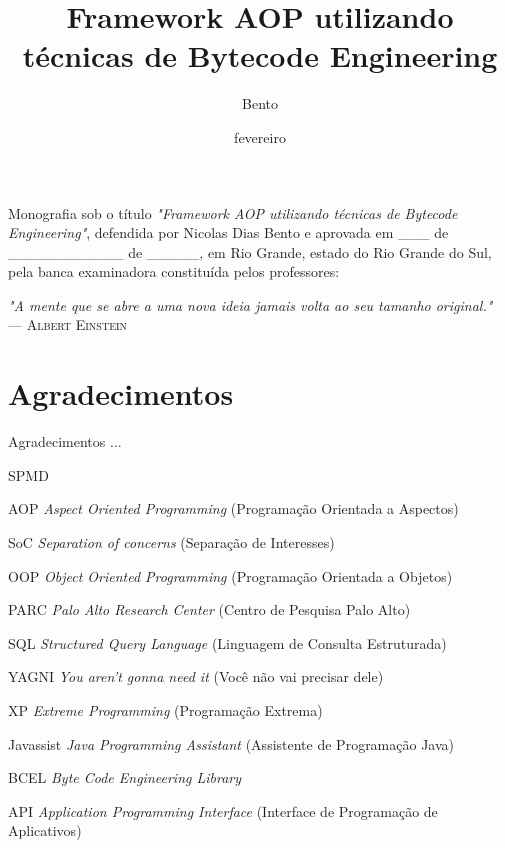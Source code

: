\documentclass[tc,oneside]{iiufrgs}
\title{Framework AOP utilizando técnicas de Bytecode Engineering}
\author{Bento}{Nicolas Dias}
\date{fevereiro}{2014}
\begin{document}
\maketitle

\begin{folhadeaprovacao}
Monografia sob o título \textit{"Framework AOP utilizando técnicas de Bytecode Engineering"}, defendida por Nicolas Dias Bento e aprovada em \_\_\_ de \_\_\_\_\_\_\_\_\_\_\_ de \_\_\_\_\_, em Rio Grande, estado do Rio Grande do Sul, pela banca examinadora constituída pelos professores:
\end{folhadeaprovacao}

\clearpage

\begin{flushright}
\mbox{}\vfill
{\sffamily\itshape
"A mente que se abre a uma nova ideia jamais volta ao seu tamanho original."\\}
--- \textsc{Albert Einstein}
\end{flushright}

\chapter*{Agradecimentos}

Agradecimentos ...

\tableofcontents

\begin{listofabbrv}{SPMD}
	\item[AOP] \textit{Aspect Oriented Programming} (Programação Orientada a Aspectos)
	\item[SoC] \textit{Separation of concerns} (Separação de Interesses)
	\item[OOP] \textit{Object Oriented Programming} (Programação Orientada a Objetos)
	\item[PARC] \textit{Palo Alto Research Center} (Centro de Pesquisa Palo Alto) 
	\item[SQL] \textit{Structured Query Language} (Linguagem de Consulta Estruturada)
	\item[YAGNI] \textit{You aren’t gonna need it} (Você não vai precisar dele)
	\item[XP] \textit{Extreme Programming} (Programação Extrema)
	\item[Javassist] \textit{Java Programming Assistant} (Assistente de Programação Java)
	\item[BCEL] \textit{Byte Code Engineering Library}
	\item[API] \textit{Application Programming Interface} (Interface de Programação de Aplicativos)
\end{listofabbrv}
\end{document}
